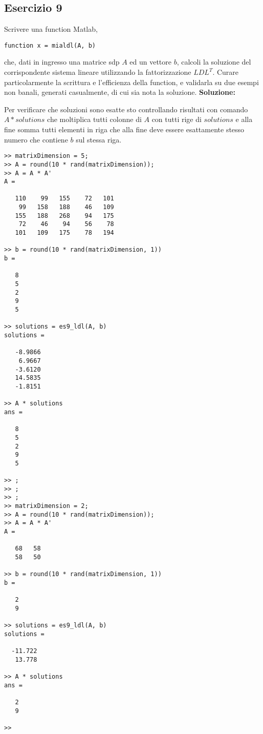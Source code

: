 \subsection{Esercizio 9}
Scrivere una function Matlab,
\begin{lstlisting}
function x = mialdl(A, b)
\end{lstlisting}
che, dati in ingresso una matrice sdp $A$ ed un vettore $b$, calcoli la soluzione
del corrispondente sistema lineare utilizzando la fattorizzazione $LDL^T$.
Curare particolarmente la scrittura e l'efficienza della function,
e validarla su due esempi non banali, generati casualmente, di cui sia nota la soluzione.
\newline \textbf{Soluzione:} \newline

Per verificare che soluzioni sono esatte sto controllando risultati con comando $A * solutions$
che moltiplica tutti colonne di $A$ con tutti rige di $solutions$ e alla fine somma tutti
elementi in riga che alla fine deve essere esattamente stesso numero
che contiene $b$ sul stessa riga.
\begin{lstlisting}
>> matrixDimension = 5;
>> A = round(10 * rand(matrixDimension));
>> A = A * A'
A =

   110    99   155    72   101
    99   158   188    46   109
   155   188   268    94   175
    72    46    94    56    78
   101   109   175    78   194

>> b = round(10 * rand(matrixDimension, 1))
b =

   8
   5
   2
   9
   5

>> solutions = es9_ldl(A, b)
solutions =

   -8.9866
    6.9667
   -3.6120
   14.5835
   -1.8151

>> A * solutions
ans =

   8
   5
   2
   9
   5

>> ;
>> ;
>> ;
>> matrixDimension = 2;
>> A = round(10 * rand(matrixDimension));
>> A = A * A'
A =

   68   58
   58   50

>> b = round(10 * rand(matrixDimension, 1))
b =

   2
   9

>> solutions = es9_ldl(A, b)
solutions =

  -11.722
   13.778

>> A * solutions
ans =

   2
   9

>>
\end{lstlisting}
